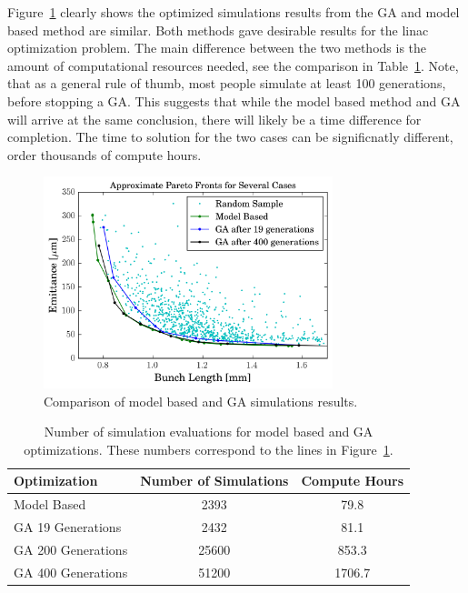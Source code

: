 Figure~\ref{fig:GAvsModel} clearly shows the optimized simulations results from 
the GA and model based method are similar. Both methods gave desirable 
results for the linac optimization problem. 
The main difference between the two methods is the amount of computational 
resources needed, see the comparison in Table~\ref{tab:optcompare}.
Note, that as a general rule of thumb, most people simulate at least 100 generations, before stopping a GA.
This suggests that while the model based method and GA will arrive at 
the same conclusion, there will likely be a time difference for completion. 
The time to solution for the two cases can be significnatly different, 
order thousands of compute hours.
\begin{figure}
	\centering
	\includegraphics[width=0.75\textwidth]{./images/model_vs_ga}
	\caption{Comparison of model based and GA simulations results.}
	\label{fig:GAvsModel}
\end{figure}
\begin{table}%
	\caption{Number of simulation evaluations for model based and GA optimizations.
	These numbers correspond to the lines in Figure~\ref{fig:GAvsModel}.}
	\label{tab:optcompare}
	\begin{center}
		\begin{tabular}{lcc}
			\toprule
			\toprule
			\textbf{Optimization} & \textbf{Number of Simulations} & \textbf{Compute Hours} \\
			\midrule
			Model Based  		& 2393  & 79.8 \\
			GA 19 Generations 	& 2432  & 81.1 \\
			GA 200 Generations 	& 25600 & 853.3\\
			GA 400 Generations 	& 51200 & 1706.7\\
			\bottomrule
		\end{tabular}
	\end{center}
\end{table}

